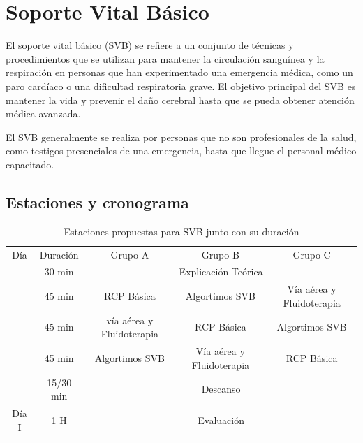 \section{Soporte Vital Básico}
El soporte vital básico (SVB) se refiere a un conjunto de técnicas y procedimientos que se utilizan para mantener la circulación sanguínea y la respiración en personas que han experimentado una emergencia médica, como un paro cardíaco o una dificultad respiratoria grave. El objetivo principal del SVB es mantener la vida y prevenir el daño cerebral hasta que se pueda obtener atención médica avanzada.

El SVB generalmente se realiza por personas que no son profesionales de la salud, como testigos presenciales de una emergencia, hasta que llegue el personal médico capacitado.
\subsection{Estaciones y cronograma}
\begin{table}[hptb]
    \centering
    \begin{tabular}{ccccc}
        \rowcolor[HTML]{333333} 
        {\color[HTML]{FFFFFF} Día} & {\color[HTML]{FFFFFF} Duración} & {\color[HTML]{FFFFFF} Grupo A} & {\color[HTML]{FFFFFF} Grupo B} & {\color[HTML]{FFFFFF} Grupo C} \\
         & 30 min &
            \multicolumn{3}{c}{Explicación Teórica} \\
         & \cellcolor[HTML]{D9D9D9}45 min &
            \cellcolor[HTML]{D9D9D9} RCP Básica &
            \cellcolor[HTML]{D9D9D9} Algortimos SVB &
            \cellcolor[HTML]{D9D9D9} Vía aérea y Fluidoterapia \\
         & 45 min &
            vía aérea y Fluidoterapia &
            RCP Básica &
            Algortimos SVB\\
         &\cellcolor[HTML]{D9D9D9} 45 min &
            \cellcolor[HTML]{D9D9D9} Algortimos SVB &
            \cellcolor[HTML]{D9D9D9} Vía aérea y Fluidoterapia &
            \cellcolor[HTML]{D9D9D9} RCP Básica \\
         & 15/30 min & \multicolumn{3}{c}{Descanso} \\
        \multirow{-6}{*}{Día I} &\cellcolor[HTML]{D9D9D9} 1 H &
            \multicolumn{3}{c}{\cellcolor[HTML]{D9D9D9}Evaluación} \\ \hline
    \end{tabular}
    \caption{Estaciones propuestas para SVB junto con su duración}
    \label{tab:Brusilov:SVB:Estaciones}
\end{table}

